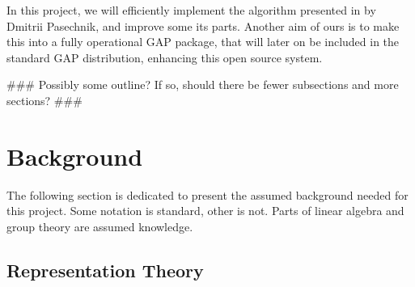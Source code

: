 \documentclass[11pt]{article}
\begin{document}
In this project, we will efficiently implement the algorithm presented
in \cite{Pas21} by Dmitrii Pasechnik, and improve some its parts. Another aim of
ours is to make this into a fully operational GAP package, that will later on
be included in the standard GAP distribution, enhancing this open source system.

\#\#\# Possibly some outline? If so, should there be fewer subsections and more
sections? \#\#\#

\newpage

\section{Background}

The following section is dedicated to present the assumed background needed for this project.
Some notation is standard, other is not. Parts of linear algebra and group theory are assumed knowledge.

\subsection{Representation Theory}
\end{document}
